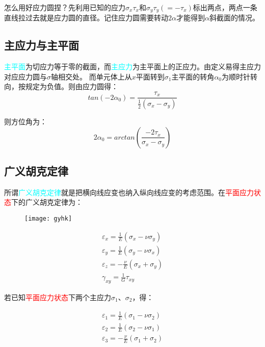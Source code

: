 \documentclass[10pt,a4paper]{ctexart}
\begin{document}
怎么用好应力圆捏？先利用已知的应力$\sigma_x$$\tau_x$和$\sigma_y$$\tau_y(=-\tau_x)$标出两点，两点一条直线拉过去就是应力圆的直径。记住应力圆需要转动$2\alpha$才能得到$\alpha$斜截面的情况。

\subsection{主应力与主平面}
\textcolor{cyan}{主平面}为切应力等于零的截面，而\textcolor{cyan}{主应力}为主平面上的正应力。由定义易得主应力对应应力圆与$\sigma$轴相交处。 而单元体上从$x$平面转到$\sigma_1$主平面的转角$\alpha_0$为顺时针转向，按规定为负值。则由应力圆得：
\begin{equation}
	tan(-2\alpha_0)=\frac{\tau_x}{\frac{1}{2}(\sigma_x-\sigma_y)}
\end{equation}

则方位角为：
\begin{equation}
	2\alpha_0=arctan(\frac{-2\tau_x}{\sigma_x-\sigma_y})
\end{equation}

\subsection{广义胡克定律}
所谓\textcolor{cyan}{广义胡克定律}就是把横向线应变也纳入纵向线应变的考虑范围。在\textcolor{red}{平面应力状态}下的广义胡克定律为：
\begin{figure}[htp]%
	\centering
	\texttt{[image: gyhk]}
\end{figure}

\begin{equation}
\begin{aligned}
	\varepsilon_x=\frac{1}{E}(\sigma_x-\nu\sigma_y)\\
	\varepsilon_y=\frac{1}{E}(\sigma_y-\nu\sigma_x)\\
	\varepsilon_z=-\frac{\nu}{E}(\sigma_x+\sigma_y)\\
	\gamma_{xy}=\frac{1}{G}\tau_{xy}
\end{aligned}
\end{equation}

若已知\textcolor{red}{平面应力状态}下两个主应力$\sigma_1$、$\sigma_2$，得：

\begin{equation}
	\begin{aligned}
	\varepsilon_1=\frac{1}{E}(\sigma_1-\nu\sigma_2)\\
	\varepsilon_2=\frac{1}{E}(\sigma_2-\nu\sigma_1)\\
	\varepsilon_3=-\frac{\nu}{E}(\sigma_1+\sigma_2)
	\end{aligned}
\end{equation}
\end{document}
